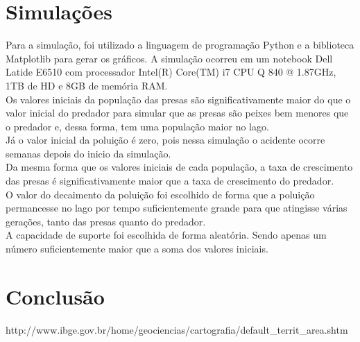 \documentclass[a4paper]{article}
\begin{document}
\section{Simula\c{c}\~oes}
Para a simula\c{c}\~ao, foi utilizado a linguagem de programa\c{c}\~ao Python e a biblioteca Matplotlib para gerar os gr\'aficos. A simula\c{c}\~ao ocorreu em um notebook Dell Latide E6510 com processador Intel(R) Core(TM) i7 CPU Q 840 @ 1.87GHz, 1TB de HD e 8GB de mem\'oria RAM.
\\
Os valores iniciais da popula\c{c}\~ao das presas s\~ao significativamente maior do que o valor inicial do predador para simular que as presas s\~ao peixes bem menores que o predador e, dessa forma, tem uma popula\c{c}\~ao maior no lago.
\\
J\'a o valor inicial da polui\c{c}\~ao \'e zero, pois nessa simula\c{c}\~ao o acidente ocorre semanas depois do inicio da simula\c{c}\~ao.
\\
Da mesma forma que os valores iniciais de cada popula\c{c}\~ao, a taxa de crescimento das presas \'e significativamente maior que a taxa de crescimento do predador.
\\
O valor do decaimento da polui\c{c}\~ao foi escolhido de forma que a polui\c{c}\~ao permancesse no lago por tempo suficientemente grande para que atingisse v\'arias gera\c{c}\~oes, tanto das presas quanto do predador.
\\
A capacidade de suporte foi escolhida de forma aleat\'oria. Sendo apenas um n\'umero suficientemente maior que a soma dos valores iniciais.
\\

\section{Conclus\~ao}
\begin{thebibliography}{99}
 http://www.ibge.gov.br/home/geociencias/cartografia/default\_territ\_area.shtm
\end{thebibliography}
\end{document}
